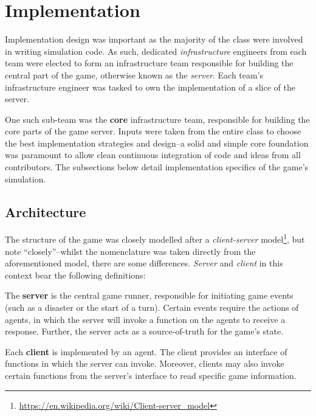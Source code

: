 
\section{Implementation}
\label{sec:GD:implementation}

Implementation design was important as the majority of the class were involved in writing simulation code. As such, dedicated \emph{infrastructure} engineers from each team were elected to form an infrastructure team responsible for building the central part of the game, otherwise known as the \emph{server}. Each team's infrastructure engineer was tasked to own the implementation of a slice of the server.

One such sub-team was the \textbf{core} infrastructure team, responsible for building the core parts of the game server. Inputs were taken from the entire class to choose the best implementation strategies and design--a solid and simple core foundation was paramount to allow clean continuous integration of code and ideas from all contributors. The subsections below detail implementation specifics of the game's simulation.

\subsection{Architecture}
\label{sec:GD:implementation:arch}

The structure of the game was closely modelled after a \emph{client-server} model\footnote{\url{https://en.wikipedia.org/wiki/Client-server_model}}, but note ``closely''--whilst the nomenclature was taken directly from the aforementioned model, there are some differences. \emph{Server} and \emph{client} in this context bear the following definitions:

\begin{definition} \label{def:server}
    The \textbf{server} is the central game runner, responsible for initiating game events (such as a disaster or the start of a turn). Certain events require the actions of agents, in which the server will invoke a function on the agents to receive a response. Further, the server acts as a source-of-truth for the game's state.
\end{definition}


\begin{definition} \label{def:client}
    Each \textbf{client} is implemented by an agent. The client provides an interface of functions in which the server can invoke. Moreover, clients may also invoke certain functions from the server's interface to read specific game information.
\end{definition}


